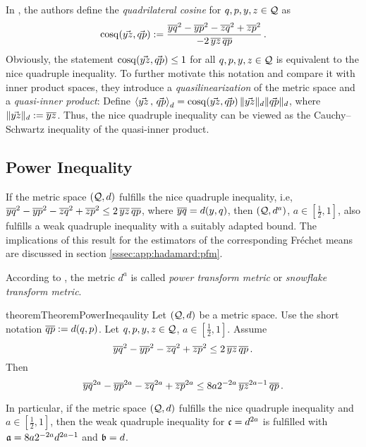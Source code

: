 In \cite{berg08}, the authors define the \textit{quadrilateral cosine} for $q,p,y,z\in\mathcal{Q}$ as
\begin{equation*}
	\mathrm{cosq}\!\left( \vec{yz}, \vec{qp} \right) := \frac{\overline{yq}^2 - \overline{yp}^2 - \overline{zq}^2 + \overline{zp}^2}{-2 \,\overline{yz}\, \overline{qp}}\, .
\end{equation*}
Obviously, the statement $\mathrm{cosq}\!\left( \vec{yz}, \vec{qp} \right) \leq 1$ for all $q,p,y,z\in\mathcal{Q}$ is equivalent to the nice quadruple inequality. To further motivate this notation and compare it with inner product spaces, they introduce a \textit{quasilinearization} of the metric space and a \textit{quasi-inner product}:
Define $\left\langle\vec{yz}\,,\, \vec{qp}\right\rangle_d =	\mathrm{cosq}\!\left( \vec{yz}, \vec{qp} \right) \Vert \vec{yz} \Vert_d \Vert \vec{qp} \Vert_d$, where $\Vert \vec{yz} \Vert_d := \overline{yz}$.
Thus, the nice quadruple inequality can be viewed as the Cauchy--Schwartz inequality of the quasi-inner product. 
%
%
%
\subsection{Power Inequality}\label{ssec:pwer_inequality}
%
If the metric space $(\mathcal{Q},d)$ fulfills the nice quadruple inequality, i.e, $\overline{yq}^2 - \overline{yp}^2 - \overline{zq}^2 + \overline{zp}^2 \leq 2 \,\overline{yz}\, \overline{qp}$, where $\overline{yq} = d(y,q)$, then $(\mathcal{Q},d^a)$, $a\in[\frac12,1]$, also fulfills a weak quadruple inequality with a suitably adapted bound. The implications of this result for the estimators of the corresponding Fréchet means are discussed in section \ref{sssec:app:hadamard:pfm}.

According to \cite{deza09}, the metric $d^a$ is called \textit{power transform metric} or \textit{snowflake transform metric}.
%
\begin{restatable}{theorem}{TheoremPowerIneqaulity}\label{thm:power_inequ}
	Let $(\mathcal{Q}, d)$ be a metric space. Use the short notation $\overline{qp} := d(q,p)$.
	Let $q,p,y,z\in\mathcal{Q}$, $a\in[\frac12,1]$. 
	Assume
	\begin{equation}\label{eq:nice_power_inequ}
		\overline{yq}^{2} - \overline{yp}^{2} - \overline{zq}^{2} + \overline{zp}^{2} \leq 2 \, \overline{yz}\, \overline{qp}
		\, .
	\end{equation}
	Then 
	\begin{equation}\label{eq:nice_power_inequ_res}
		\overline{yq}^{2a} - \overline{yp}^{2a} - \overline{zq}^{2a} + \overline{zp}^{2a} \leq 8 a 2^{-2a} \, \overline{yz}^{2a-1}\, \overline{qp}
		\, .
	\end{equation}
\end{restatable}
% 
In particular, if the metric space $(\mathcal{Q},d)$ fulfills the nice quadruple inequality and $a\in[\frac12,1]$, then the weak quadruple inequality for $\mathfrak{c} = d^{2a}$ is fulfilled with $\mathfrak{a} = 8 a 2^{-2a} d^{2a-1}$ and $\mathfrak{b} = d$.

